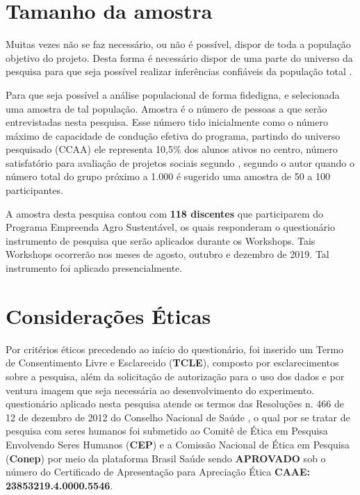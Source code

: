 \section{Tamanho da amostra}

Muitas  vezes  não  se  faz necessário,  ou não é possível, dispor de toda a população objetivo do projeto. Desta forma é necessário dispor de uma parte do universo da pesquisa para que seja possível realizar inferências confiáveis da população total \cite{marino_manual_2003}.

Para que seja possível a análise populacional de forma fidedigna, e selecionada uma amostra de tal população. Amostra é o número de pessoas a que serão entrevistadas nesta pesquisa. Esse número tido inicialmente como o número máximo de capacidade de condução efetiva do programa, partindo do universo pesquisado (CCAA) ele representa 10,5\% dos alunos ativos no centro, número satisfatório para avaliação de projetos sociais segundo , segundo o autor quando o número total do grupo próximo a 1.000 é sugerido uma amostra de 50 a 100 participantes. 

A amostra desta pesquisa contou com \textbf{118 discentes} que participarem do Programa Empreenda Agro Sustentável, os quais responderam o questionário instrumento de pesquisa que serão aplicados durante os Workshops. Tais Workshops ocorrerão nos meses de agosto, outubro e dezembro de 2019. Tal instrumento foi aplicado presencialmente. 


\section{Considerações Éticas}

Por critérios éticos precedendo ao início do questionário, foi inserido um Termo de Consentimento Livre e Esclarecido (\textbf{TCLE}), composto por esclarecimentos sobre a pesquisa, além da solicitação de autorização para o uso dos dados e por ventura imagem que seja necessária ao desenvolvimento do experimento. questionário aplicado nesta pesquisa atende os termos das Resoluções n. 466 de 12 de dezembro de 2012 do Conselho Nacional de Saúde \cite{cns_resolucao_2012}, o qual por se tratar de pesquisa com seres humanos foi submetido ao Comitê de Ética em Pesquisa Envolvendo Seres Humanos (\textbf{CEP}) e a Comissão Nacional de Ética em Pesquisa (\textbf{Conep}) por meio da plataforma Brasil Saúde sendo \textbf{APROVADO} sob o número do Certificado de Apresentação para Apreciação Ética \textbf{CAAE: 23853219.4.0000.5546}.




